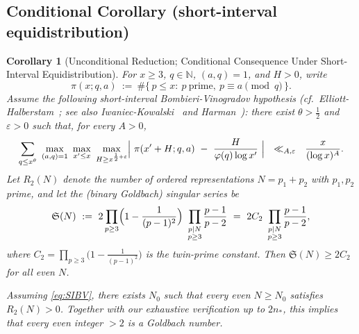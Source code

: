 \documentclass[11pt]{article}
\theoremstyle{inline}
\theoremstyle{break}
\theoremstyle{break}
\theoremstyle{break}
\theoremstyle{break}
\theoremstyle{break}
\theoremstyle{break}
\newtheorem{corollary}{Corollary}
\theoremstyle{break}
\theoremstyle{inline}
\newcommand{\nprodstar}{n_{\ast}}  %
\begin{document}
\subsection{Conditional Corollary (short-interval equidistribution)}\label{sec:SI-BV}
\begin{corollary}[Unconditional Reduction; Conditional Consequence Under Short-Interval Equidistribution]
\label{cor:SI-BV}
For \(x\ge 3\), \(q\in\mathbb{N}\), \((a,q)=1\), and \(H>0\), write
\begin{equation}\label{eq:pi-AP}
\pi(x; q,a)\ :=\ \#\{\,p\le x:\ p\ \text{prime},\ p\equiv a\!\!\pmod q\,\}.
\end{equation}
Assume the following short-interval Bombieri-Vinogradov hypothesis (cf.\ Elliott-Halberstam~\cite{ElliottHalberstam1968}; see also Iwaniec-Kowalski~\cite[Chs.~17-18]{IwaniecKowalski2004} and Harman~\cite[Chs.~17,~28]{Harman2007}): there exist \(\theta>\tfrac{1}{2}\) and \(\varepsilon>0\) such that, for every \(A>0\),
\begin{equation}\label{eq:SIBV}
\sum_{q\le x^{\theta}}
\ \max_{\substack{(a,q)=1}}\ \max_{x'\le x}\ \max_{H\ge x^{\frac{1}{2}+\varepsilon}}
\Bigl|\ \pi(x'+H;q,a)\ -\ \frac{H}{\varphi(q)\log x'}\ \Bigr|
\ \ \ll_{A,\varepsilon}\ \ \frac{x}{(\log x)^A}.
\end{equation}
Let \(R_2(N)\) denote the number of \emph{ordered} representations \(N=p_1+p_2\) with \(p_1,p_2\) prime, and let the (binary Goldbach) singular series be
\begin{equation}\label{eq:sing-series}
\mathfrak S(N)\ :=\ 2\prod_{p\ge 3}\Bigl(1-\frac{1}{(p-1)^2}\Bigr)\ \prod_{\substack{p\mid N\\ p\ge 3}}\frac{p-1}{p-2}
\ =\ 2C_2\ \prod_{\substack{p\mid N\\ p\ge 3}}\frac{p-1}{p-2},
\end{equation}
where \(C_2=\prod_{p\ge 3}\bigl(1-\frac{1}{(p-1)^2}\bigr)\) is the twin-prime constant. Then \(\mathfrak S(N)\ge 2C_2\) for all even \(N\).

Assuming \eqref{eq:SIBV}, there exists \(N_0\) such that every even \(N\ge N_0\) satisfies \(R_2(N)>0\). Together with our exhaustive verification up to \(2\nprodstar\), this implies that every even integer \(>2\) is a Goldbach number.
\end{corollary}
\end{document}
